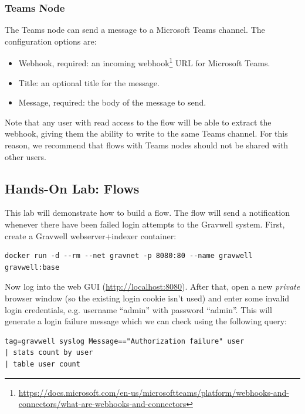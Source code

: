 \subsubsection{Teams Node}
The Teams node can send a message to a Microsoft Teams channel. The configuration options are:

\begin{itemize}
\item Webhook, required: an incoming webhook\footnote{\href{https://docs.microsoft.com/en-us/microsoftteams/platform/webhooks-and-connectors/what-are-webhooks-and-connectors}{https://docs.microsoft.com/en-us/microsoftteams/platform/webhooks-and-connectors/what-are-webhooks-and-connectors}} URL for Microsoft Teams.
\item Title: an optional title for the message.
\item Message, required: the body of the message to send.
\end{itemize}

Note that any user with read access to the flow will be able to extract the webhook, giving them the ability to write to the same Teams channel. For this reason, we recommend that flows with Teams nodes should not be shared with other users.

\clearpage
\subsection{Hands-On Lab: Flows}
\label{sec:flow-lab}
This lab will demonstrate how to build a flow. The flow will send a notification whenever there have been failed login attempts to the Gravwell system. First, create a Gravwell webserver+indexer container:

\begin{Verbatim}[breaklines=true]
docker run -d --rm --net gravnet -p 8080:80 --name gravwell gravwell:base
\end{Verbatim}

Now log into the web GUI (\href{http://localhost:8080}{http://localhost:8080}). After that, open a new \emph{private} browser window (so the existing login cookie isn't used) and enter some invalid login credentials, e.g. username ``admin'' with password ``admin''. This will generate a login failure message which we can check using the following query:

\begin{Verbatim}[breaklines=true]
tag=gravwell syslog Message=="Authorization failure" user
| stats count by user
| table user count
\end{Verbatim}


